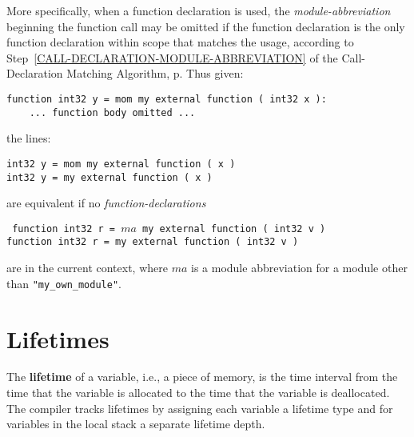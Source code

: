 \documentclass[12pt]{article}
\newcommand{\key}[1]{{\rm \bfseries #1}}
\newcommand{\pagref}[1]{p\pageref{#1}}
\newenvironment{indpar}[1][0.3in]%
	{\begin{list}{}%
		     {\setlength{\itemsep}{0in}%
		      \setlength{\topsep}{0in}%
		      \setlength{\parsep}{1ex}%
		      \setlength{\labelwidth}{#1}%
		      \setlength{\leftmargin}{#1}%
		      \addtolength{\leftmargin}{\labelsep}}%
	 \item}%
	{\end{list}}
\begin{document}
More specifically,
when a function declaration is used, the {\em module-abbreviation}
beginning the function call may be omitted if the function declaration is
the only function declaration within scope that matches the usage,
according to Step~\ref{CALL-DECLARATION-MODULE-ABBREVIATION}
of the Call-Declaration Matching Algorithm,
\pagref{CALL-DECLARATION-MODULE-ABBREVIATION}.
Thus given:
\begin{indpar}\begin{verbatim}
function int32 y = mom my external function ( int32 x ):
    ... function body omitted ...
\end{verbatim}\end{indpar}
the lines:
\begin{indpar}\begin{verbatim}
int32 y = mom my external function ( x )
int32 y = my external function ( x )
\end{verbatim}\end{indpar}
are equivalent if no {\em function-declarations}
\begin{indpar}\tt
function int32 r = $ma$ my external function ( int32 v ) \\
function int32 r = my external function ( int32 v )
\end{indpar}
are in the current context, where $ma$ is a module abbreviation for a module
other than {\tt "my\_own\_module"}.

\section{Lifetimes}
\label{LIFETIMES}

The \key{lifetime} of a variable, i.e., a piece of memory,
is the time interval from the time that the variable
is allocated to the time that
the variable is deallocated.  The compiler tracks lifetimes by assigning each
variable a lifetime type and for variables in the local stack
a separate lifetime depth.
\end{document}
